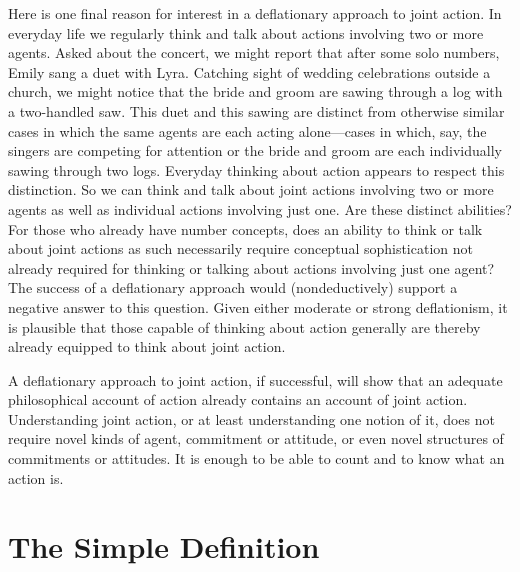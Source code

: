 \documentclass[12pt,a4paper]{extarticle}
\begin{document}
Here is one final reason for interest in a deflationary approach to joint action.
In everyday life we regularly think and talk about actions involving two or more agents.
Asked about the concert, we might report that after some solo numbers, Emily %
sang a duet with Lyra. %
Catching sight of wedding celebrations outside a church, we might notice that the bride and groom are sawing through a log with a two-handled saw.
This duet and this sawing are distinct from otherwise similar cases in which the same agents are each acting alone---cases in which, say, the singers are competing for attention or the bride and groom are each individually sawing through two logs.
Everyday thinking about action appears to respect this distinction. 
So we can think and talk about joint actions involving two or more agents as well as individual actions involving just one.
Are these distinct abilities?
For those who already have number concepts, does an ability to think or talk about joint actions as such necessarily require conceptual sophistication not already required for thinking or talking about actions involving just one agent?
The success of a deflationary approach would (nondeductively) support a negative answer to this question.
Given either moderate or strong deflationism, it is plausible that those capable of thinking about action generally are thereby already equipped to think about joint action.

A deflationary approach to joint action, if successful, will show  that
an adequate philosophical account of action already contains an account of joint action.
Understanding joint action, or at least understanding one notion of it, does not require novel kinds of agent, commitment or attitude, or even novel structures of commitments or attitudes.
It is enough to be able to count and to know what an action is.

\label{end_section_deflationary}


\section{The Simple Definition}
	\label{section_simple_definition}
\end{document}
